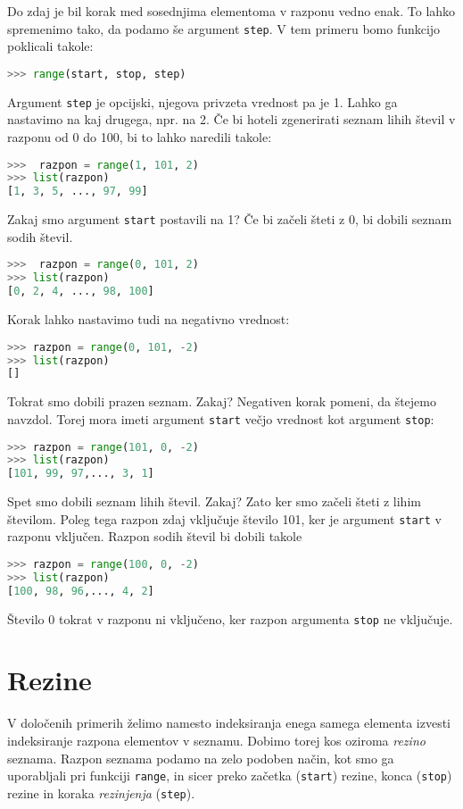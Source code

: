 Do zdaj je bil korak med sosednjima elementoma v razponu vedno enak. To lahko spremenimo tako, da podamo še argument \texttt{step}. V tem primeru bomo funkcijo poklicali takole:
\begin{lstlisting}[language=Python]
>>> range(start, stop, step)
\end{lstlisting}
Argument \texttt{step} je opcijski, njegova privzeta vrednost pa je 1. Lahko ga nastavimo na kaj drugega, npr. na 2. Če bi hoteli zgenerirati seznam lihih števil v razponu od 0 do 100, bi to lahko naredili takole:
\begin{lstlisting}[language=Python]
>>>  razpon = range(1, 101, 2)
>>> list(razpon)
[1, 3, 5, ..., 97, 99]
\end{lstlisting}
Zakaj smo argument \texttt{start} postavili na 1? Če bi začeli šteti z 0, bi dobili seznam sodih števil.
\begin{lstlisting}[language=Python]
>>>  razpon = range(0, 101, 2)
>>> list(razpon)
[0, 2, 4, ..., 98, 100]
\end{lstlisting}
Korak lahko nastavimo tudi na negativno vrednost:
\begin{lstlisting}[language=Python]
>>> razpon = range(0, 101, -2)
>>> list(razpon)
[]
\end{lstlisting}
Tokrat smo dobili prazen seznam. Zakaj? Negativen korak pomeni, da štejemo navzdol. Torej mora imeti argument \texttt{start} večjo vrednost kot argument \texttt{stop}:
\begin{lstlisting}[language=Python]
>>> razpon = range(101, 0, -2)
>>> list(razpon)
[101, 99, 97,..., 3, 1]
\end{lstlisting}
Spet smo dobili seznam lihih števil. Zakaj? Zato ker smo začeli šteti z lihim številom. Poleg tega razpon zdaj vključuje število 101, ker je argument \texttt{start} v razponu vključen. Razpon sodih števil bi dobili takole
\begin{lstlisting}[language=Python]
>>> razpon = range(100, 0, -2)
>>> list(razpon)
[100, 98, 96,..., 4, 2]
\end{lstlisting}
Število 0 tokrat v razponu ni vključeno, ker razpon argumenta \texttt{stop} ne vključuje. 

\section{Rezine}

V določenih primerih želimo namesto indeksiranja enega samega elementa izvesti indeksiranje razpona elementov v seznamu. Dobimo torej kos oziroma \emph{rezino}  seznama. Razpon seznama podamo na zelo podoben način, kot smo ga uporabljali pri funkciji \texttt{range}, in sicer preko začetka (\texttt{start}) rezine, konca (\texttt{stop}) rezine in koraka \emph{rezinjenja} (\texttt{step}).

